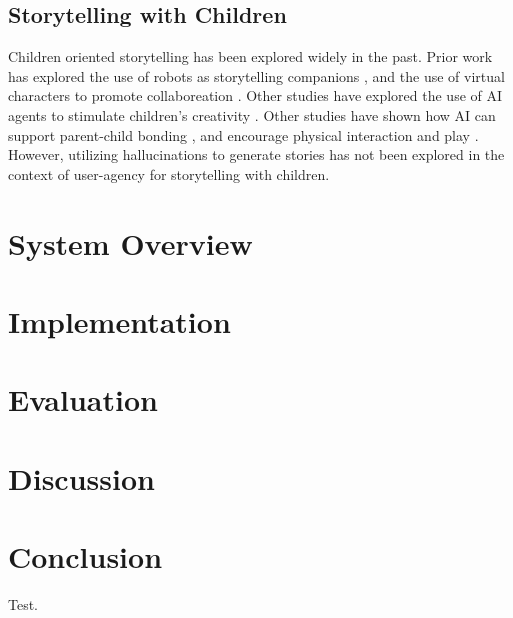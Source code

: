 \documentclass[submit,techrep,english]{ipsj}
\begin{document}
\subsection{Storytelling with Children}
Children oriented storytelling has been explored widely in the past. Prior work has explored the use of robots as storytelling companions \cite{7:SunLLL17}, and the use of virtual characters to promote collaboreation \cite{2:LiuLWCS12}. Other studies have explored the use of AI agents to stimulate children's creativity \cite{1:ElgarfP22}. Other studies have shown how AI can support parent-child bonding \cite{12:ZhangXWYRWYWL22}, and encourage physical interaction and play \cite{3:ZhaoB23}.
However, utilizing hallucinations to generate stories has not been explored in the context of user-agency for storytelling with children.

\section{System Overview}

\section{Implementation}

\section{Evaluation}

\section{Discussion}

\section{Conclusion}

\begin{acknowledgment}
    Test.
\end{acknowledgment}




\appendix
\end{document}
